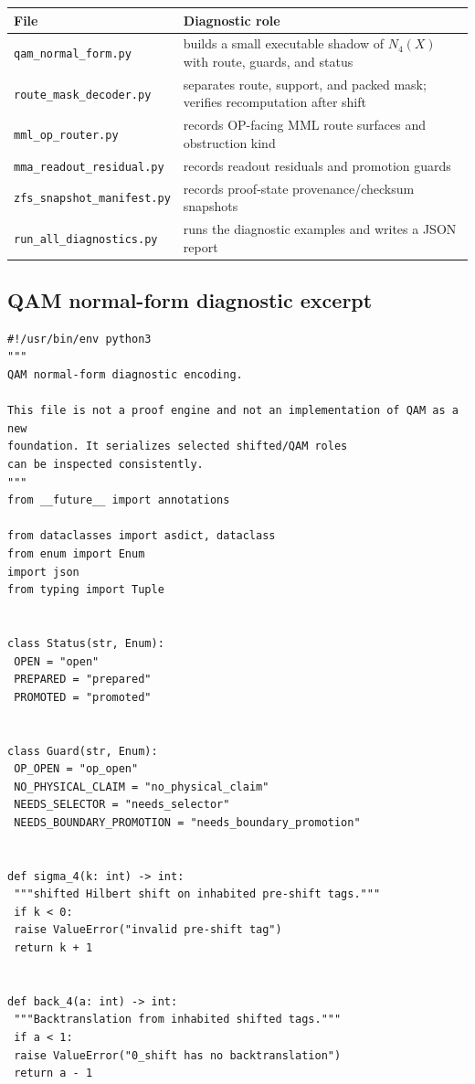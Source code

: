 \begin{center}
\scriptsize
\setlength{\tabcolsep}{2pt}
\begin{tabular}{@{}p{}P{0.62\textwidth}@{}}
\toprule
File & Diagnostic role\\
\midrule
\texttt{qam\_normal\_form.py} & builds a small executable shadow of \(N_4(X)\) with route, guards, and status\\
\texttt{route\_mask\_decoder.py} & separates route, support, and packed mask; verifies recomputation after shift\\
\texttt{mml\_op\_router.py} & records OP-facing MML route surfaces and obstruction kind\\
\texttt{mma\_readout\_residual.py} & records readout residuals and promotion guards\\
\texttt{zfs\_snapshot\_manifest.py} & records proof-state provenance/checksum snapshots\\
\texttt{run\_all\_diagnostics.py} & runs the diagnostic examples and writes a JSON report\\
\bottomrule
\end{tabular}
\end{center}

\subsection{QAM normal-form diagnostic excerpt}
\label{subsec:v410r01-qam-normal-form-diagnostic-excerpt}
\begin{verbatim}
#!/usr/bin/env python3
"""
QAM normal-form diagnostic encoding.

This file is not a proof engine and not an implementation of QAM as a new
foundation. It serializes selected shifted/QAM roles
can be inspected consistently.
"""
from __future__ import annotations

from dataclasses import asdict, dataclass
from enum import Enum
import json
from typing import Tuple


class Status(str, Enum):
 OPEN = "open"
 PREPARED = "prepared"
 PROMOTED = "promoted"


class Guard(str, Enum):
 OP_OPEN = "op_open"
 NO_PHYSICAL_CLAIM = "no_physical_claim"
 NEEDS_SELECTOR = "needs_selector"
 NEEDS_BOUNDARY_PROMOTION = "needs_boundary_promotion"


def sigma_4(k: int) -> int:
 """shifted Hilbert shift on inhabited pre-shift tags."""
 if k < 0:
 raise ValueError("invalid pre-shift tag")
 return k + 1


def back_4(a: int) -> int:
 """Backtranslation from inhabited shifted tags."""
 if a < 1:
 raise ValueError("0_shift has no backtranslation")
 return a - 1

\end{verbatim}

